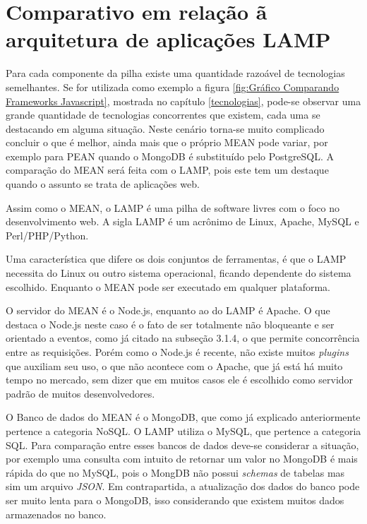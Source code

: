 \newpage   
  
\section{Comparativo em relação ã arquitetura de aplicações LAMP}
\label{Comparativo em relação a arquitetura de aplicações LAMP}
    Para cada componente da pilha existe uma quantidade razoável de tecnologias semelhantes. Se for utilizada  como exemplo a figura \ref{fig:Gráfico Comparando Frameworks Javascript}, mostrada no capítulo \ref{tecnologias}, pode-se observar uma grande quantidade de tecnologias concorrentes que existem, cada uma se destacando em alguma situação. Neste cenário torna-se muito complicado concluir o que é melhor, ainda mais que o próprio MEAN pode variar, por exemplo para PEAN quando o MongoDB é substituído pelo PostgreSQL. 
    A comparação do MEAN será feita com o LAMP, pois este tem um destaque quando o assunto se trata de aplicações web. \cite{meanVSlamp}
   
   Assim como o MEAN, o LAMP é uma pilha de software livres com o foco no desenvolvimento web. A sigla LAMP é um acrônimo de Linux, Apache, MySQL e Perl/PHP/Python.
   
   Uma característica que difere os dois conjuntos de ferramentas, é que o LAMP necessita do Linux ou outro sistema operacional, ficando dependente do sistema escolhido. Enquanto o MEAN pode ser executado em qualquer plataforma.
   
    O servidor do MEAN é o Node.js, enquanto ao do LAMP é Apache. O que destaca o Node.js neste caso é o fato de ser totalmente não bloqueante e ser orientado a eventos, como já citado na subseção 3.1.4, o que permite concorrência entre as requisições. Porém como o Node.js é recente, não existe muitos \textit{plugins} que auxiliam seu uso, o que não acontece com o Apache, que já está há muito tempo no mercado, sem dizer que em muitos casos ele é escolhido como servidor padrão de muitos desenvolvedores.
    
    O Banco de dados do MEAN é o MongoDB, que como já explicado anteriormente pertence a categoria NoSQL. O LAMP utiliza o MySQL, que pertence a categoria SQL. Para comparação entre esses bancos de dados deve-se considerar a situação, por exemplo uma consulta com intuito de retornar um valor no MongoDB é mais rápida do que no MySQL, pois o MongDB não possui \textit{schemas} de tabelas mas sim um arquivo \textit{JSON}. Em contrapartida, a atualização dos dados do banco pode ser muito lenta para o MongoDB, isso considerando que existem muitos dados armazenados no banco.
    
